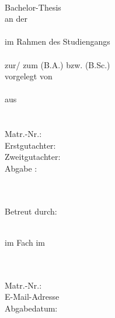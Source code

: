 \documentclass[a4paper, 11pt, german ]{article}
\def\True{1}
\begin{document}



\begin{titlepage}
\if\BachlorThesis\True
	\vspace*{20ex}
	\begin{center}
		
		\textbf{\thetitle}\\
		\vspace{10ex}
		Bachelor-Thesis\\
		an der \\
		\Hochschulname\\
		im Rahmen des Studiengangs \\
		\Studiengang \\
		zur/ zum \Abschlussbezeinung (B.A.) bzw. (B.Sc.) \\
	
		\vspace{1ex}
		vorgelegt von \\
		\theauthor \\
		aus\\
		\Addresse\\
		\Email\\
		
		\vspace{1ex}
		Matr.-Nr.: \MatrNummer\\
		
		\vspace{10ex}
		Erstgutachter: \Pruefer \\
		Zweitgutachter: \ZweitGutachter \\
		\vspace{1ex}
		Abgabe : \thedate
	\end{center}

\else


\raggedright
\vspace*{20ex}
\Hochschulname \\
\Studiengang\\
Betreut durch: \Pruefer

\vspace{10ex}
\begin{center}
	\ArtArbeit\\
	\vspace{1ex}
	im Fach \Modul im \Semester\\
	
	\vspace{10ex}
	\textbf{\thetitle}

\end{center}

\vspace{10ex}
\theauthor\\
\Addresse\\
Matr.-Nr.: \MatrNummer\\
\vspace{1ex}
E-Mail-Adresse \Email\\
\vspace{3ex}
Abgabedatum: \thedate

\fi
\restoregeometry
\end{titlepage}
\end{document}
